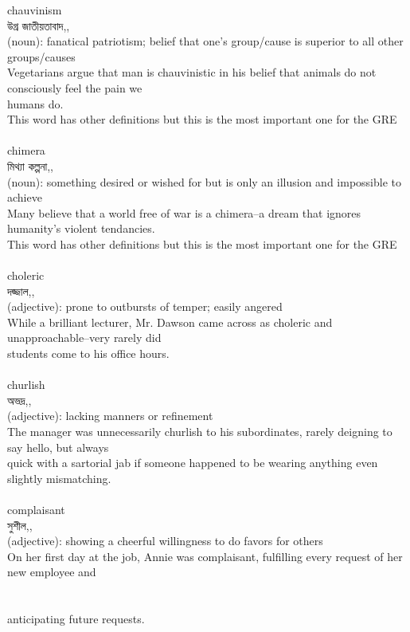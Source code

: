 \documentclass{article}
\begin{document}
{chauvinism}\\
{উগ্র জাতীয়তাবাদ,,}\\
{(noun): fanatical patriotism; belief that one's group/cause is superior to all other\\groups/causes\\Vegetarians argue that man is chauvinistic in his belief that animals do not consciously feel the pain we\\humans do.\\This word has other definitions but this is the most important one for the GRE\\}\\
{chimera}\\
{মিথ্যা কল্পনা,,}\\
{(noun): something desired or wished for but is only an illusion and impossible to achieve\\Many believe that a world free of war is a chimera--a dream that ignores humanity's violent tendancies.\\This word has other definitions but this is the most important one for the GRE\\}\\
{choleric}\\
{দজ্জাল,,}\\
{(adjective): prone to outbursts of temper; easily angered\\While a brilliant lecturer, Mr. Dawson came across as choleric and unapproachable--very rarely did\\students come to his office hours.\\}\\
{churlish}\\
{অভদ্র,,}\\
{(adjective): lacking manners or refinement\\The manager was unnecessarily churlish to his subordinates, rarely deigning to say hello, but always\\quick with a sartorial jab if someone happened to be wearing anything even slightly mismatching.\\}\\
{complaisant}\\
{সুশীল,,}\\
{(adjective): showing a cheerful willingness to do favors for others\\On her first day at the job, Annie was complaisant, fulfilling every request of her new employee and\\\\                                                                                \\anticipating future requests.\\}\\
\end{document}

